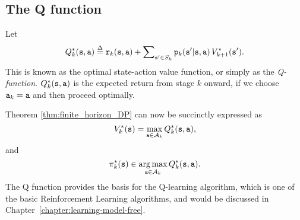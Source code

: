 \subsection{The Q function}
Let
\[{Q^*_k}(\state,\action) \buildrel \Delta \over = {\reward_k}(\state,\action) + \sum\nolimits_{\state' \in {S_k}} {{\transitionprob_k}(\state'|\state,\action)\,V_{k+1}^{*}(\state')} .\]
This is known as the optimal state-action value function, or simply
as the \emph{Q-function}. ${Q^*_k}({\tt s},{\tt a})$ is the expected
return from stage $k$ onward, if we choose ${{\tt a}_k} = {\tt a}$
and then proceed optimally.

Theorem \ref{thm:finite_horizon_DP} can now be succinctly expressed as
\[V_k^{*}({\tt s}) = \mathop {\max }\limits_{{\tt a} \in {\mathcal{A}_k}} {Q^*_k}({\tt s},{\tt a}),\]
and
\[\pi _k^*({\tt s}) \in \mathop {\arg \max }\limits_{{\tt a} \in {\mathcal{A}_k}} {Q^*_k}({\tt s},{\tt a}).\]
The Q function provides the basis for the Q-learning algorithm,
which is one of the basic Reinforcement Learning algorithms, and
would be discussed in Chapter~\ref{chapter:learning-model-free}.









